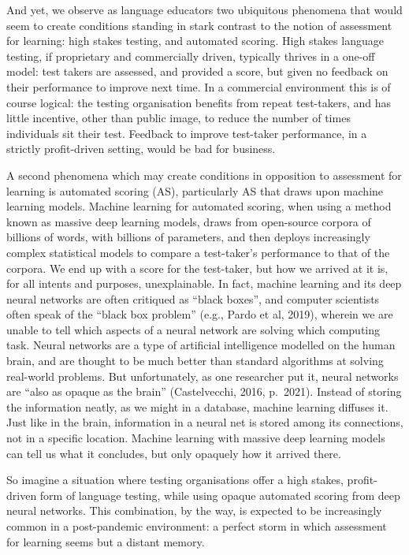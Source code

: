 \documentclass[
]{book}
\begin{document}
And yet, we observe as language educators two ubiquitous phenomena that would seem to create conditions standing in stark contrast to the notion of assessment for learning: high stakes testing, and automated scoring. High stakes language testing, if proprietary and commercially driven, typically thrives in a one-off model: test takers are assessed, and provided a score, but given no feedback on their performance to improve next time. In a commercial environment this is of course logical: the testing organisation benefits from repeat test-takers, and has little incentive, other than public image, to reduce the number of times individuals sit their test. Feedback to improve test-taker performance, in a strictly profit-driven setting, would be bad for business.

A second phenomena which may create conditions in opposition to assessment for learning is automated scoring (AS), particularly AS that draws upon machine learning models. Machine learning for automated scoring, when using a method known as massive deep learning models, draws from open-source corpora of billions of words, with billions of parameters, and then deploys increasingly complex statistical models to compare a test-taker's performance to that of the corpora. We end up with a score for the test-taker, but how we arrived at it is, for all intents and purposes, unexplainable. In fact, machine learning and its deep neural networks are often critiqued as ``black boxes'', and computer scientists often speak of the ``black box problem'' (e.g., Pardo et al, 2019), wherein we are unable to tell which aspects of a neural network are solving which computing task. Neural networks are a type of artificial intelligence modelled on the human brain, and are thought to be much better than standard algorithms at solving real-world problems. But unfortunately, as one researcher put it, neural networks are ``also as opaque as the brain'' (Castelvecchi, 2016, p.~2021). Instead of storing the information neatly, as we might in a database, machine learning diffuses it. Just like in the brain, information in a neural net is stored among its connections, not in a specific location. Machine learning with massive deep learning models can tell us what it concludes, but only opaquely how it arrived there.

So imagine a situation where testing organisations offer a high stakes, profit-driven form of language testing, while using opaque automated scoring from deep neural networks. This combination, by the way, is expected to be increasingly common in a post-pandemic environment: a perfect storm in which assessment for learning seems but a distant memory.
\end{document}
